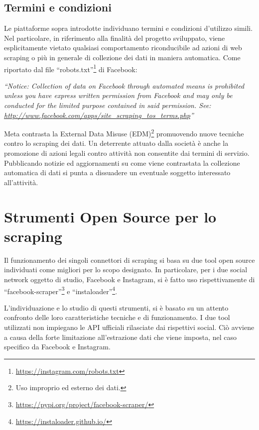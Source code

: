 \subsection{Termini e condizioni}
Le piattaforme sopra introdotte individuano termini e condizioni d'utilizzo simili. Nel particolare, in riferimento alla finalit\`a del progetto sviluppato, viene esplicitamente vietato qualsiasi comportamento riconducibile ad azioni di web scraping o pi\`u in generale di collezione dei dati in maniera automatica.\cite{doi:10.1177/2056305120940703}
Come riportato dal file ``robots.txt''\footnote{\url{https://instagram.com/robots.txt}} di Facebook:
\begin{center}
    \textit{``Notice: Collection of data on Facebook through automated means is prohibited unless you have express written permission from Facebook and may only be conducted for the limited purpose contained in said permission. See: \url{http://www.facebook.com/apps/site_scraping_tos_terms.php}''}
\end{center}
Meta contrasta la External Data Misuse (EDM)\footnote{Uso improprio ed esterno dei dati.} promuovendo nuove tecniche contro lo scraping dei dati.
Un deterrente attuato dalla societ\`a \`e anche la promozione di azioni legali contro attivit\`a non consentite dai termini di servizio. Pubblicando notizie ed aggiornamenti su come viene contrastata la collezione automatica di dati si punta a dissuadere un eventuale soggetto interessato all'attivit\`a.


\section{Strumenti Open Source per lo scraping}
Il funzionamento dei singoli connettori di scraping si basa su due tool open source individuati come migliori per lo scopo designato. In particolare, per i due social network oggetto di studio, Facebook e Instagram, si \`e fatto uso rispettivamente di ``facebook-scraper''\footnote{\url{https://pypi.org/project/facebook-scraper/}} e ``instaloader''\footnote{\url{https://instaloader.github.io/}}.

L'individuazione e lo studio di questi strumenti, si \`e basato su un attento confronto delle loro caratteristiche tecniche e di funzionamento.
I due tool utilizzati non impiegano le API ufficiali rilasciate dai rispettivi social. Ci\`o avviene a causa della forte limitazione all'estrazione dati che viene imposta, nel caso specifico da Facebook e Instagram. 

